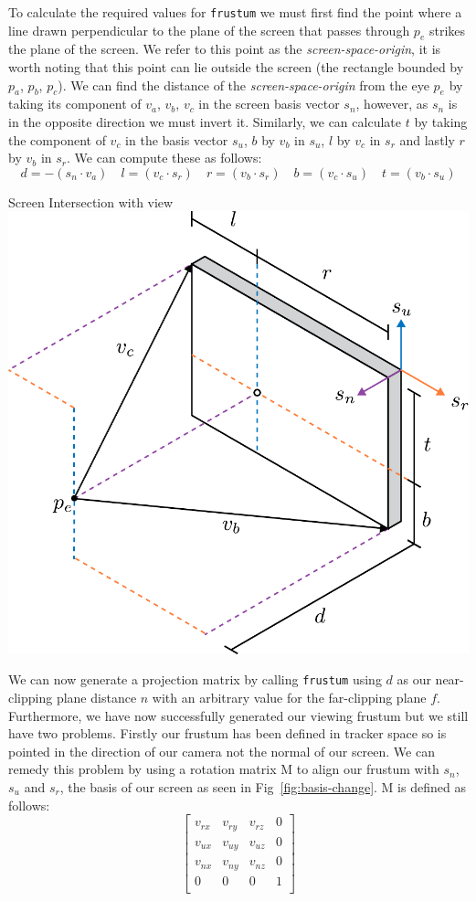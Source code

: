 To calculate the required values for \texttt{frustum} we must first find the point where a line drawn perpendicular to the plane of the screen that passes through $p_e$ strikes the plane of the screen. We refer to this point as the {\it screen-space-origin}, it is worth noting that this point can lie outside the screen (the rectangle bounded by $p_a$, $p_b$, $p_c$). We can find the distance of the {\it screen-space-origin} from the eye $p_e$ by taking its component of $v_a$, $v_b$, $v_c$ in the screen basis vector $s_n$, however, as $s_n$ is in the opposite direction we must invert it. Similarly, we can calculate $t$ by taking the component of $v_c$ in the basis vector $s_u$, $b$ by $v_b$ in $s_u$, $l$ by $v_c$ in $s_r$ and lastly $r$ by $v_b$ in $s_r$. We can compute these as follows:
\[ d= -(s_n \cdot v_a) \quad l = (v_c \cdot s_r) \quad r = (v_b \cdot s_r) \quad b = (v_c \cdot s_u) \quad t = (v_b \cdot s_u) \]

\begin{figureBox}[label={fig:screen-extents}, width=0.8\linewidth]{Screen Intersection with view}
    \includegraphics[width = 0.5\linewidth]{./background/figures/projection/eye-projection.pdf}
\end{figureBox}

We can now generate a projection matrix by calling \texttt{frustum} using $d$ as our near-clipping plane distance $n$ with an arbitrary value for the far-clipping plane $f$. Furthermore, we have now successfully generated our viewing frustum but we still have two problems. Firstly our frustum has been defined in tracker space so is pointed in the direction of our camera not the normal of our screen. We can remedy this problem by using a rotation matrix M to align our frustum with $s_n$, $s_u$ and $s_r$, the basis of our screen as seen in Fig~\ref{fig:basis-change}. M is defined as follows:
\[
    \begin{bmatrix}
        v_{rx} & v_{ry} & v_{rz} & 0 \\
        v_{ux} & v_{uy} & v_{uz} & 0 \\
        v_{nx} & v_{ny} & v_{nz} & 0 \\
        0      & 0      & 0      & 1 \\
    \end{bmatrix}
\]


